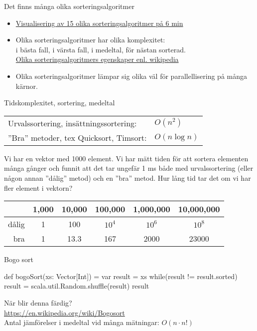 \begin{Slide}{Det finns många olika sorteringsalgoritmer}
\begin{itemize}
\item \href{https://www.youtube.com/watch?v=kPRA0W1kECg}{Visualisering av 15 olika sorteringsalgoritmer på 6 min}
\item Olika sorteringsalgoritmer har olika komplexitet: \\ i bästa fall, i värsta fall, i medeltal, för nästan sorterad. \\
\href{https://en.wikipedia.org/wiki/Sorting_algorithm}{Olika sorteringsalgoritmers egenskaper enl. wikipedia}
\item Olika sorteringsalgoritmer lämpar sig olika väl för parallellisering på många kärnor.
\end{itemize}
\end{Slide}


\begin{Slide}{Tidskomplexitet, sortering, medeltal}
\begin{tabular}{ll}
Urvalssortering, insättningssortering: & $O(n^2)$ \\
''Bra'' metoder, tex Quicksort, Timsort:  & $O(n\log n)$
\end{tabular}

\vspace{1em}\footnotesize
Vi har en vektor med 1000 element. Vi har mätt tiden för att sortera elementen många gånger och funnit att det tar ungefär 1 ms både med urvalssortering (eller någon annan ''dålig'' metod) och en ''bra'' metod. Hur lång tid tar det om vi har fler element i vektorn?

\vspace{1em}
\begin{tabular}{rccccc}
       & 1,000 & 10,000 & 100,000 & 1,000,000 & 10,000,000 \\ \hline
dålig  & 1     & 100    & $10^4$  & $10^6$   & $10^8$ \\
bra    & 1     & 13.3   & 167     & 2000     & 23000
\end{tabular}
\end{Slide}

\begin{Slide}{Bogo sort}
\begin{Code}
def bogoSort(xs: Vector[Int]) = {
  var result = xs
  while(result != result.sorted) {
    result = scala.util.Random.shuffle(result)
  }
  result
}
\end{Code}
När blir denna färdig? \pause \\
\url{https://en.wikipedia.org/wiki/Bogosort}\\
Antal jämförelser i medeltal vid många mätningar: $ O(n \cdot n!) $
\end{Slide}




